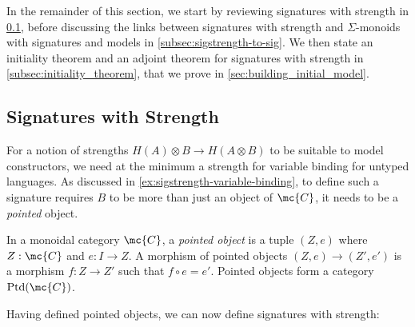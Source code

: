 %
In the remainder of this section, we start by reviewing signatures with
strength in \cref{subsec:sig_with_strength}, before discussing the links
between signatures with strength and $Σ$-monoids with signatures and models
in \cref{subsec:sigstrength-to-sig}.
We then state an initiality theorem and an adjoint theorem for signatures
with strength in \cref{subsec:initiality_theorem}, that we prove in \cref{sec:building_initial_model}.



\subsection{Signatures with Strength}
\label{subsec:sig_with_strength}

For a notion of strengths $H(A) ⊗ B → H(A ⊗ B)$ to be suitable to model constructors,
we need at the minimum a strength for variable binding for untyped languages.
%
As discussed in \cref{ex:sigstrength-variable-binding}, to define such a signature requires $B$
to be more than just an object of $\mc{C}$, it needs to be a \emph{pointed} object.

\begin{definition}
  \label{def:pointed-object}
  In a monoidal category $\mc{C}$, a \emph{pointed object} is a tuple $(Z,e)$
  where $Z : \mc{C}$ and $e : I → Z$.
  A morphism of pointed objects $(Z,e) → (Z',e')$ is a morphism $f : Z → Z'$
  such that $f \circ e = e'$.
  Pointed objects form a category $\mathrm{Ptd}(\mc{C})$.
\end{definition}

Having defined pointed objects, we can now define signatures with strength:

